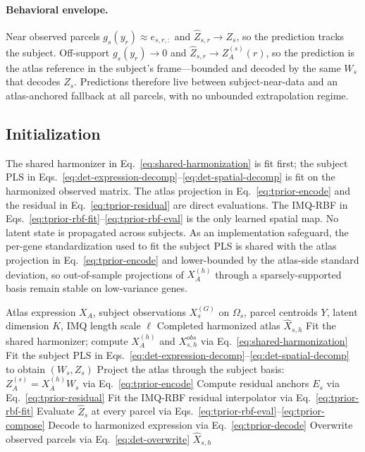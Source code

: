 \documentclass[11pt]{article}
\numberwithin{equation}{section}
\begin{document}
\paragraph{Behavioral envelope.}
Near observed parcels $g_s(y_r) \approx e_{s,r,:}$ and $\hat{Z}_{s,r} \to Z_s$,
so the prediction tracks the subject.  Off-support $g_s(y_r) \to 0$ and
$\hat{Z}_{s,r} \to Z_A^{(s)}(r)$, so the prediction is the atlas reference in the
subject's frame---bounded and decoded by the same $W_s$ that decodes $Z_s$.
Predictions therefore live between subject-near-data and an atlas-anchored
fallback at all parcels, with no unbounded extrapolation regime.

\subsection{Initialization}
The shared harmonizer in Eq.~\eqref{eq:shared-harmonization} is fit first; the
subject PLS in
Eqs.~\eqref{eq:det-expression-decomp}--\eqref{eq:det-spatial-decomp} is fit on
the harmonized observed matrix.  The atlas projection in
Eq.~\eqref{eq:tprior-encode} and the residual in Eq.~\eqref{eq:tprior-residual}
are direct evaluations.  The IMQ-RBF in
Eqs.~\eqref{eq:tprior-rbf-fit}--\eqref{eq:tprior-rbf-eval} is the only learned
spatial map.  No latent state is propagated across subjects.  As an
implementation safeguard, the per-gene standardization used to fit the subject
PLS is shared with the atlas projection in Eq.~\eqref{eq:tprior-encode} and
lower-bounded by the atlas-side standard deviation, so out-of-sample projections
of $X_A^{(h)}$ through a sparsely-supported basis remain stable on low-variance
genes.

\begin{algorithm}[H]
\caption{DLAM atlas-prior residual variant for subject $s$}
\begin{algorithmic}[1]
\Require Atlas expression $X_A$, subject observations $X_s^{(G)}$ on $\Omega_s$,
         parcel centroids $Y$, latent dimension $K$, IMQ length scale $\ell$
\Ensure Completed harmonized atlas $\hat{X}_{s,h}$
\State Fit the shared harmonizer; compute $X_A^{(h)}$ and $X_{s,h}^{obs}$ via
       Eq.~\eqref{eq:shared-harmonization}
\State Fit the subject PLS in
       Eqs.~\eqref{eq:det-expression-decomp}--\eqref{eq:det-spatial-decomp}
       to obtain $(W_s, Z_s)$
\State Project the atlas through the subject basis:
       $Z_A^{(s)} = X_A^{(h)} W_s$ via Eq.~\eqref{eq:tprior-encode}
\State Compute residual anchors $E_s$ via Eq.~\eqref{eq:tprior-residual}
\State Fit the IMQ-RBF residual interpolator via Eq.~\eqref{eq:tprior-rbf-fit}
\State Evaluate $\hat{Z}_s$ at every parcel via
       Eqs.~\eqref{eq:tprior-rbf-eval}--\eqref{eq:tprior-compose}
\State Decode to harmonized expression via Eq.~\eqref{eq:tprior-decode}
\State Overwrite observed parcels via Eq.~\eqref{eq:det-overwrite}
\State \Return $\hat{X}_{s,h}$
\end{algorithmic}
\end{algorithm}
\end{document}
